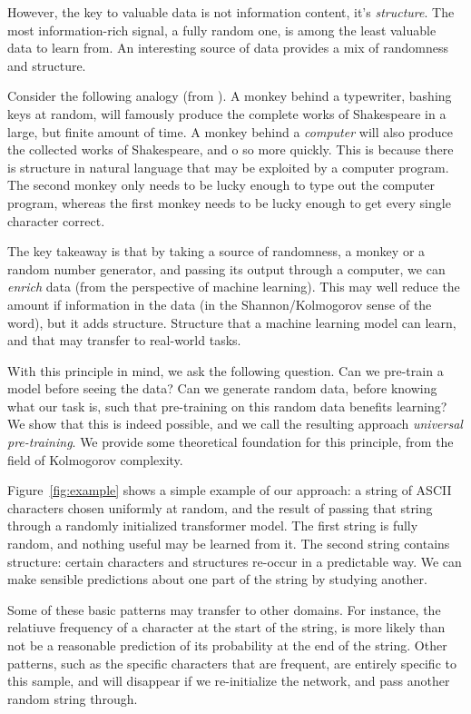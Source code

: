 \documentclass{article} %
\begin{document}
However, the key to valuable data is not information content, it's \emph{structure}. The most information-rich signal, a fully random one, is among the least valuable data to learn from. An interesting source of data provides a mix of randomness and structure.

Consider the following analogy (from \cite{}). A monkey behind a typewriter, bashing keys at random, will famously produce the complete works of Shakespeare in a large, but finite amount of time. A monkey behind a \emph{computer} will also produce the collected works of Shakespeare, and o so more quickly. This is because there is structure in natural language that may be exploited by a computer program. The second monkey only needs to be lucky enough to type out the computer program, whereas the first monkey needs to be lucky enough to get every single character correct.

The key takeaway is that by taking a source of randomness, a monkey or a random number generator, and passing its output through a computer, we can \emph{enrich} data (from the perspective of machine learning). This may well reduce the amount if information in the data (in the Shannon/Kolmogorov sense of the word), but it adds structure. Structure that a machine learning model can learn, and that may transfer to real-world tasks.

With this principle in mind, we ask the following question. Can we pre-train a model before seeing the data? Can we generate random data, before knowing what our task is, such that pre-training on this random data benefits learning? We show that this is indeed possible, and we call the resulting approach \emph{universal pre-training}. We provide some theoretical foundation for this principle, from the field of Kolmogorov complexity.

Figure~\ref{fig:example} shows a simple example of our approach: a string of ASCII characters chosen uniformly at random, and the result of passing that string through a randomly initialized transformer model. The first string is fully random, and nothing useful may be learned from it. The second string contains structure: certain characters and structures re-occur in a predictable way. We can make sensible predictions about one part of the string by studying another. 

Some of these basic patterns may transfer to other domains. For instance, the relatiuve frequency of a character at the start of the string, is more likely than not be a reasonable prediction of its probability at the end of the string. Other patterns, such as the specific characters that are frequent, are entirely specific to this sample, and will disappear if we re-initialize the network, and pass another random string through. 
\end{document}
